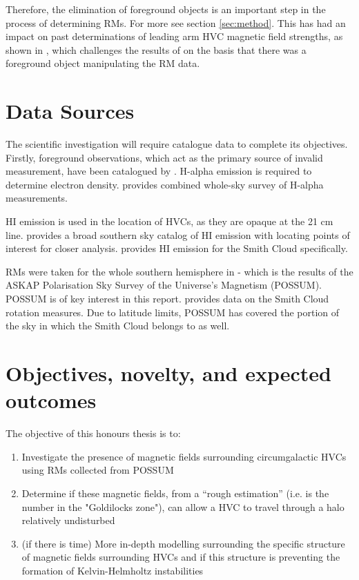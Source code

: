 Therefore, the elimination of foreground objects is an important step in the process of determining RMs. For more see section \ref{sec:method}. This has had an impact on past determinations of leading arm HVC magnetic field strengths, as shown in \citep{ID36}, which challenges the results of \citep{ID2} on the basis that there was a foreground object manipulating the RM data.

\section{Data Sources}
\label{sec:sources}

The scientific investigation will require catalogue data to complete its objectives. Firstly, foreground observations, which act as the primary source of invalid measurement, have been catalogued by \citep{ID44, ID45}. H-alpha emission is required to determine electron density. \citep{ID43} provides combined whole-sky survey of H-alpha measurements.

HI emission is used in the location of HVCs, as they are opaque at the 21 cm line. \citep{ID3, ID6} provides a broad southern sky catalog of HI emission with \citep{ID3} locating points of interest for closer analysis. \citep{ID28} provides HI emission for the Smith Cloud specifically.

RMs were taken for the whole southern hemisphere in \citep{ID1} - which is the results of the ASKAP Polarisation Sky Survey of the Universe’s Magnetism (POSSUM). POSSUM is of key interest in this report. \citep{ID18} provides data on the Smith Cloud rotation measures. Due to latitude limits, POSSUM has covered the portion of the sky in which the Smith Cloud belongs to as well.

\section{Objectives, novelty, and expected outcomes}
\label{sec:objectives}

The objective of this honours thesis is to:
\begin{enumerate}
\item Investigate the presence of magnetic fields surrounding circumgalactic HVCs using RMs collected from POSSUM
\item Determine if these magnetic fields, from a “rough estimation” (i.e. is the number in the "Goldilocks zone"), can allow a HVC to travel through a halo relatively undisturbed
\item (if there is time) More in-depth modelling surrounding the specific structure of magnetic fields surrounding HVCs and if this structure is preventing the formation of Kelvin-Helmholtz instabilities
\end{enumerate}

